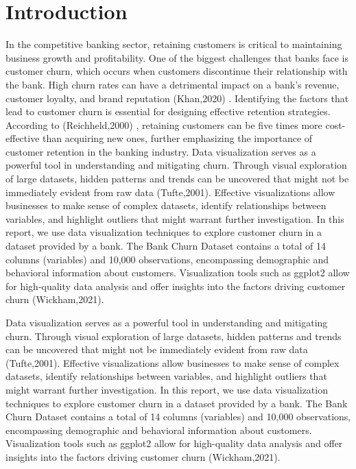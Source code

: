 \documentclass[12pt]{article}
\begin{document}
\section{Introduction}
\vspace{0.2cm}

In the competitive banking sector, retaining customers is critical to maintaining business growth and profitability. One of the biggest challenges that banks face is customer churn, which occurs when customers discontinue their relationship with the bank. High churn rates can have a detrimental impact on a bank’s revenue, customer loyalty, and brand reputation (Khan,2020) \cite{khan2020}. Identifying the factors that lead to customer churn is essential for designing effective retention strategies. According to (Reichheld,2000) \cite{reichheld2000}, retaining customers can be five times more cost-effective than acquiring new ones, further emphasizing the importance of customer retention in the banking industry. Data visualization serves as a powerful tool in understanding and mitigating churn. Through visual exploration of large datasets, hidden patterns and trends can be uncovered that might not be immediately evident from raw data (Tufte,2001)\cite{tufte2001}. Effective visualizations allow businesses to make sense of complex datasets, identify relationships between variables, and highlight outliers that might warrant further investigation. In this report, we use data visualization techniques to explore customer churn in a dataset provided by a bank. The Bank Churn Dataset contains a total of 14 columns (variables) and 10,000 observations, encompassing demographic and behavioral information about customers. Visualization tools such as ggplot2 allow for high-quality data analysis and offer insights into the factors driving customer churn (Wickham,2021)\cite{wickham2021}.

Data visualization serves as a powerful tool in understanding and mitigating churn. Through visual exploration of large datasets, hidden patterns and trends can be uncovered that might not be immediately evident from raw data (Tufte,2001)\cite{tufte2001}. Effective visualizations allow businesses to make sense of complex datasets, identify relationships between variables, and highlight outliers that might warrant further investigation. In this report, we use data visualization techniques to explore customer churn in a dataset provided by a bank. The Bank Churn Dataset contains a total of 14 columns (variables) and 10,000 observations, encompassing demographic and behavioral information about customers. Visualization tools such as ggplot2 allow for high-quality data analysis and offer insights into the factors driving customer churn (Wickham,2021)\cite{wickham2021}.
\end{document}
